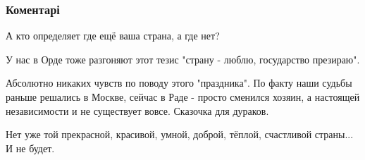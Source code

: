  
 
 
 
 
\subsubsection{Коментарі}
\label{sec:24_08_2021.fb.bondarenko_elena.1.s_dnem_nezavisimosti.cmt}

\begin{itemize}
 

А кто определяет где ещё ваша страна, а где нет?

У нас в Орде тоже разгоняют этот тезис "страну - люблю, государство презираю".


 

Абсолютно никаких чувств по поводу этого "праздника". По факту наши судьбы
раньше решались в Москве, сейчас в Раде - просто сменился хозяин, а настоящей
независимости и не существует вовсе. Сказочка для дураков.


 

Нет уже той прекрасной, красивой, умной, доброй, тёплой, счастливой страны... И
не будет.

\begin{itemize}
 

\end{itemize}
\end{itemize}
